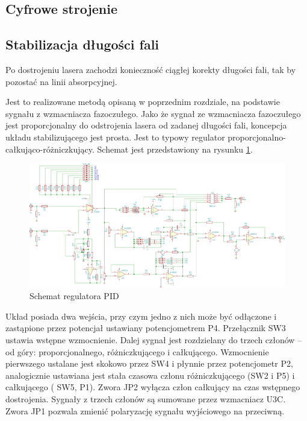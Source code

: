 \documentclass[a4paper,10pt]{article}
\begin{document}
\subsection{Cyfrowe strojenie}

\subsection{Stabilizacja długości fali}

Po dostrojeniu lasera zachodzi konieczność ciągłej korekty długości fali, tak by pozostać na linii absorpcyjnej.

Jest to realizowane metodą opisaną w poprzednim rozdziale, na podstawie sygnału z wzmacniacza fazoczułego. %
Jako że sygnał ze wzmacniacza fazoczułego jest proporcjonalny do odstrojenia lasera od zadanej długości fali, koncepcja układu stabilizującego jest prosta.
Jest to typowy regulator proporcjonalno-całkująco-różniczkujący. Schemat jest przedstawiony na rysunku \ref{sch-pid}.

\begin{figure}
\begin{center}
 \includegraphics[scale=0.4]{./obrazki/pidella.pdf}
\end{center}
\caption{Schemat regulatora PID}
\label{sch-pid}
\end{figure}

Układ posiada dwa wejścia, przy czym jedno z nich może być odłączone i zastąpione przez potencjał ustawiany potencjometrem P4. Przełącznik SW3 ustawia wstępne wzmocnienie.
Dalej sygnał jest rozdzielany do trzech członów -- od góry: proporcjonalnego, różniczkującego i całkującego.
Wzmocnienie pierwszego ustalane jest skokowo przez SW4 i płynnie przez potencjometr P2, analogicznie ustawiana jest stała czasowa członu różniczkującego (SW2 i P5) i całkującego ( SW5, P1). Zwora JP2 wyłącza człon całkujący na czas wstępnego dostrojenia.
Sygnały z trzech członów są sumowane przez wzmacniacz U3C. Zwora JP1 pozwala zmienić polaryzację sygnału wyjściowego na przeciwną.
\end{document}
